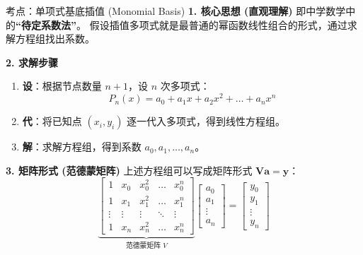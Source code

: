 \documentclass[12pt, a4paper]{article}
\begin{document}
\begin{knowpoint}{考点：单项式基底插值 (Monomial Basis)}
    \textbf{1. 核心思想 (直观理解)}
    即中学数学中的\textbf{“待定系数法”}。
    假设插值多项式就是最普通的幂函数线性组合的形式，通过求解方程组找出系数。
    
    \textbf{2. 求解步骤}
    \begin{enumerate}
        \item \textbf{设}：根据节点数量 $n+1$，设 $n$ 次多项式：
        \[ P_n(x) = a_0 + a_1 x + a_2 x^2 + \dots + a_n x^n \]
        \item \textbf{代}：将已知点 $(x_i, y_i)$ 逐一代入多项式，得到线性方程组。
        \item \textbf{解}：求解方程组，得到系数 $a_0, a_1, \dots, a_n$。
    \end{enumerate}
    
    \textbf{3. 矩阵形式 (范德蒙矩阵)}
    上述方程组可以写成矩阵形式 $\mathbf{V}\mathbf{a} = \mathbf{y}$：
    \[
    \underbrace{
    \begin{bmatrix}
    1 & x_0 & x_0^2 & \dots & x_0^n \\
    1 & x_1 & x_1^2 & \dots & x_1^n \\
    \vdots & \vdots & \vdots & \ddots & \vdots \\
    1 & x_n & x_n^2 & \dots & x_n^n
    \end{bmatrix}
    }_{\text{范德蒙矩阵 } V}
    \begin{bmatrix}
    a_0 \\ a_1 \\ \vdots \\ a_n
    \end{bmatrix}
    =
    \begin{bmatrix}
    y_0 \\ y_1 \\ \vdots \\ y_n
    \end{bmatrix}
    \]
\end{knowpoint}
\end{document}
